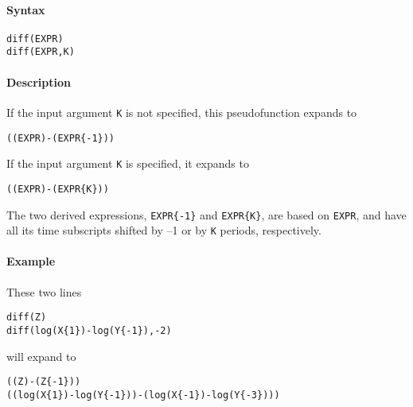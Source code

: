 


	\paragraph{Syntax}

\begin{verbatim}
diff(EXPR)
diff(EXPR,K)
\end{verbatim}

\paragraph{Description}

If the input argument \texttt{K} is not specified, this pseudofunction
expands to

\begin{verbatim}
((EXPR)-(EXPR{-1}))
\end{verbatim}

If the input argument \texttt{K} is specified, it expands to

\begin{verbatim}
((EXPR)-(EXPR{K}))
\end{verbatim}

The two derived expressions, \texttt{EXPR\{-1\}} and \texttt{EXPR\{K\}},
are based on \texttt{EXPR}, and have all its time subscripts shifted by
--1 or by \texttt{K} periods, respectively.

\paragraph{Example}

These two lines

\begin{verbatim}
diff(Z)
diff(log(X{1})-log(Y{-1}),-2)
\end{verbatim}

will expand to

\begin{verbatim}
((Z)-(Z{-1}))
((log(X{1})-log(Y{-1}))-(log(X{-1})-log(Y{-3})))
\end{verbatim}


